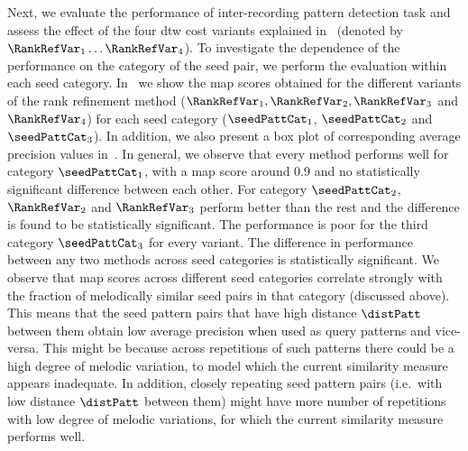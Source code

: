 Next, we evaluate the performance of inter-recording pattern detection task and assess the effect of the four \gls{dtw} cost variants explained in~ (denoted by $\RankRefVar_1 \dots \RankRefVar_4$). To investigate the dependence of the performance on the category of the seed pair, we perform the evaluation within each seed category. In~ we show the \gls{map} scores obtained for the different variants of the rank refinement method ($\RankRefVar_1, \RankRefVar_2, \RankRefVar_3$ and $\RankRefVar_4$) for each seed category ($\seedPattCat_1$, $\seedPattCat_2$ and $\seedPattCat_3$). In addition, we also present a box plot of corresponding average precision values in~. In general, we observe that every method performs well for category $\seedPattCat_1$, with a \gls{map} score around 0.9 and no statistically significant difference between each other. For category $\seedPattCat_2$, $\RankRefVar_2$ and $\RankRefVar_3$ perform better than the rest and the difference is found to be statistically significant. The performance is poor for the third category $\seedPattCat_3$ for every variant. The difference in performance between any two methods across seed categories is statistically significant. We observe that \gls{map} scores across different seed categories correlate strongly with the fraction of melodically similar seed pairs in that category (discussed above). This means that the seed pattern pairs that have high distance $\distPatt$ between them obtain low average precision when used as query patterns and vice-versa. This might be because across repetitions of such patterns there could be a high degree of melodic variation, to model which the current similarity measure appears inadequate. In addition, closely repeating seed pattern pairs (i.e.~with low distance $\distPatt$ between them) might have more number of repetitions with low degree of melodic variations, for which the current similarity measure performs well. 


